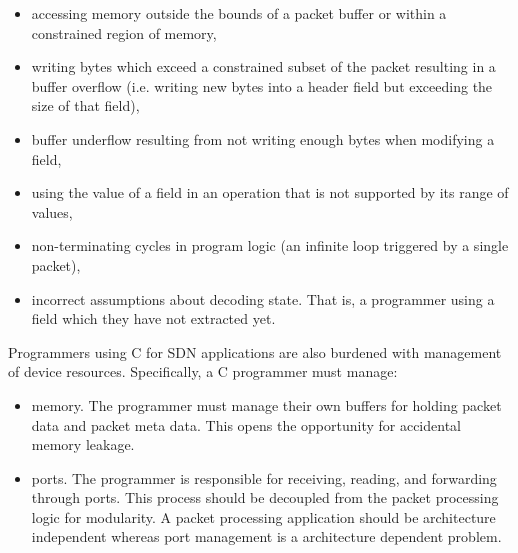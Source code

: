 \begin{itemize}
\item accessing memory outside the bounds of a packet buffer or within a constrained
region of memory,

\item writing bytes which exceed a constrained subset of the packet
resulting in a buffer overflow (i.e. writing new bytes into a header field
but exceeding the size of that field),

\item buffer underflow resulting from not writing enough bytes when modifying
a field,

\item using the value of a field in an operation that is not supported by its
range of values,

\item non-terminating cycles in program logic (an infinite loop
triggered by a single packet),

\item incorrect assumptions about decoding state. That is, a programmer using
a field which they have not extracted yet.
\end{itemize}

Programmers using C for SDN applications are also burdened with management of
device resources. Specifically, a C programmer must manage:

\begin{itemize}
\item memory. The programmer must manage their own buffers for holding packet
data and packet meta data. This opens the opportunity for accidental
memory leakage.

\item ports. The programmer is responsible for receiving, reading, and forwarding
through ports. This process should be decoupled from the packet processing logic
for modularity. A packet processing application should be architecture independent
whereas port management is a architecture dependent problem.
\end{itemize}

